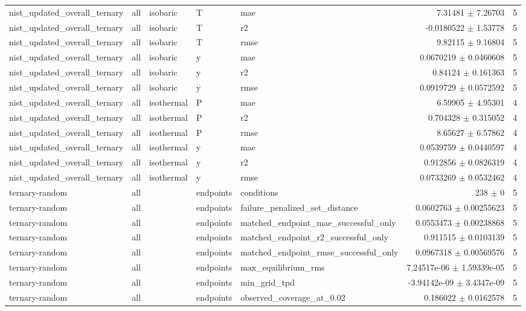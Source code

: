 \begin{tabular}{lllllrr}
nist\_updated\_overall\_ternary & all & isobaric & T & mae & 7.31481 $\pm$ 7.26703 & 5 \\
nist\_updated\_overall\_ternary & all & isobaric & T & r2 & -0.0180522 $\pm$ 1.53778 & 5 \\
nist\_updated\_overall\_ternary & all & isobaric & T & rmse & 9.82115 $\pm$ 9.16804 & 5 \\
nist\_updated\_overall\_ternary & all & isobaric & y & mae & 0.0670219 $\pm$ 0.0460608 & 5 \\
nist\_updated\_overall\_ternary & all & isobaric & y & r2 & 0.84124 $\pm$ 0.161363 & 5 \\
nist\_updated\_overall\_ternary & all & isobaric & y & rmse & 0.0919729 $\pm$ 0.0572592 & 5 \\
nist\_updated\_overall\_ternary & all & isothermal & P & mae & 6.59905 $\pm$ 4.95301 & 4 \\
nist\_updated\_overall\_ternary & all & isothermal & P & r2 & 0.704328 $\pm$ 0.315052 & 4 \\
nist\_updated\_overall\_ternary & all & isothermal & P & rmse & 8.65627 $\pm$ 6.57862 & 4 \\
nist\_updated\_overall\_ternary & all & isothermal & y & mae & 0.0539759 $\pm$ 0.0440597 & 4 \\
nist\_updated\_overall\_ternary & all & isothermal & y & r2 & 0.912856 $\pm$ 0.0826319 & 4 \\
nist\_updated\_overall\_ternary & all & isothermal & y & rmse & 0.0733269 $\pm$ 0.0532462 & 4 \\
ternary-random & all &  & endpoints & conditions & 238 $\pm$ 0 & 5 \\
ternary-random & all &  & endpoints & failure_penalized_set_distance & 0.0602763 $\pm$ 0.00255623 & 5 \\
ternary-random & all &  & endpoints & matched_endpoint_mae_successful_only & 0.0553473 $\pm$ 0.00238868 & 5 \\
ternary-random & all &  & endpoints & matched_endpoint_r2_successful_only & 0.911515 $\pm$ 0.0103139 & 5 \\
ternary-random & all &  & endpoints & matched_endpoint_rmse_successful_only & 0.0967318 $\pm$ 0.00569576 & 5 \\
ternary-random & all &  & endpoints & max_equilibrium_rms & 7.24517e-06 $\pm$ 1.59339e-05 & 5 \\
ternary-random & all &  & endpoints & min_grid_tpd & -3.94142e-09 $\pm$ 3.4347e-09 & 5 \\
ternary-random & all &  & endpoints & observed_coverage_at_0.02 & 0.186022 $\pm$ 0.0162578 & 5 \\

\end{tabular}
